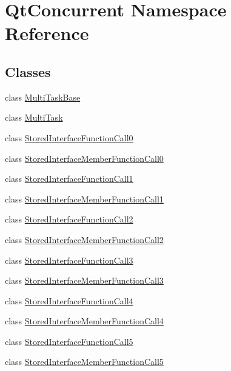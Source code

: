 \hypertarget{namespace_qt_concurrent}{\section{Qt\-Concurrent Namespace Reference}
\label{namespace_qt_concurrent}
}
\subsection*{Classes}
\begin{DoxyCompactItemize}
\item 
class \hyperlink{class_qt_concurrent_1_1_multi_task_base}{Multi\-Task\-Base}
\item 
class \hyperlink{class_qt_concurrent_1_1_multi_task}{Multi\-Task}
\item 
class \hyperlink{class_qt_concurrent_1_1_stored_interface_function_call0}{Stored\-Interface\-Function\-Call0}
\item 
class \hyperlink{class_qt_concurrent_1_1_stored_interface_member_function_call0}{Stored\-Interface\-Member\-Function\-Call0}
\item 
class \hyperlink{class_qt_concurrent_1_1_stored_interface_function_call1}{Stored\-Interface\-Function\-Call1}
\item 
class \hyperlink{class_qt_concurrent_1_1_stored_interface_member_function_call1}{Stored\-Interface\-Member\-Function\-Call1}
\item 
class \hyperlink{class_qt_concurrent_1_1_stored_interface_function_call2}{Stored\-Interface\-Function\-Call2}
\item 
class \hyperlink{class_qt_concurrent_1_1_stored_interface_member_function_call2}{Stored\-Interface\-Member\-Function\-Call2}
\item 
class \hyperlink{class_qt_concurrent_1_1_stored_interface_function_call3}{Stored\-Interface\-Function\-Call3}
\item 
class \hyperlink{class_qt_concurrent_1_1_stored_interface_member_function_call3}{Stored\-Interface\-Member\-Function\-Call3}
\item 
class \hyperlink{class_qt_concurrent_1_1_stored_interface_function_call4}{Stored\-Interface\-Function\-Call4}
\item 
class \hyperlink{class_qt_concurrent_1_1_stored_interface_member_function_call4}{Stored\-Interface\-Member\-Function\-Call4}
\item 
class \hyperlink{class_qt_concurrent_1_1_stored_interface_function_call5}{Stored\-Interface\-Function\-Call5}
\item 
class \hyperlink{class_qt_concurrent_1_1_stored_interface_member_function_call5}{Stored\-Interface\-Member\-Function\-Call5}
\end{DoxyCompactItemize}
